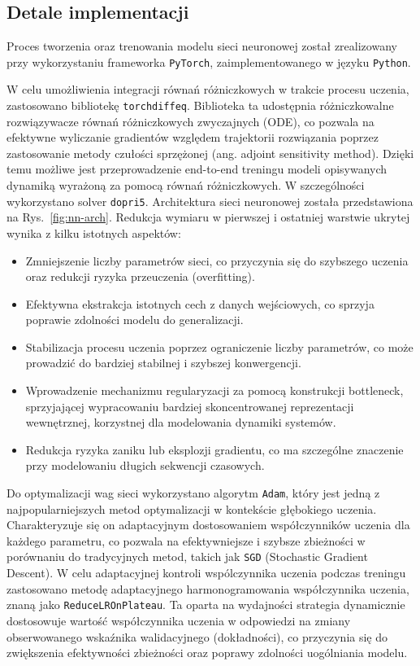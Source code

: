 \documentclass[11pt, oneside]{article}
\begin{document}
\subsection{Detale implementacji}
Proces tworzenia oraz trenowania modelu sieci neuronowej został zrealizowany przy wykorzystaniu frameworka \texttt{PyTorch}, zaimplementowanego w języku \texttt{Python}.

W celu umożliwienia integracji równań różniczkowych w trakcie procesu uczenia, zastosowano bibliotekę \texttt{torchdiffeq}. Biblioteka ta udostępnia różniczkowalne rozwiązywacze równań różniczkowych zwyczajnych (ODE), co pozwala na efektywne wyliczanie gradientów względem trajektorii rozwiązania poprzez zastosowanie metody czułości sprzężonej (ang. adjoint sensitivity method). Dzięki temu możliwe jest przeprowadzenie end-to-end treningu modeli opisywanych dynamiką wyrażoną za pomocą równań różniczkowych. W szczególności wykorzystano solver \texttt{dopri5}. Architektura sieci neuronowej została przedstawiona na Rys.~\ref{fig:nn-arch}. Redukcja wymiaru w pierwszej i ostatniej warstwie ukrytej wynika z kilku istotnych aspektów:

\begin{itemize}
    \item Zmniejszenie liczby parametrów sieci, co przyczynia się do szybszego uczenia oraz redukcji ryzyka przeuczenia (overfitting).
    \item Efektywna ekstrakcja istotnych cech z danych wejściowych, co sprzyja poprawie zdolności modelu do generalizacji.
    \item Stabilizacja procesu uczenia poprzez ograniczenie liczby parametrów, co może prowadzić do bardziej stabilnej i szybszej konwergencji.
    \item Wprowadzenie mechanizmu regularyzacji za pomocą konstrukcji bottleneck, sprzyjającej wypracowaniu bardziej skoncentrowanej reprezentacji wewnętrznej, korzystnej dla modelowania dynamiki systemów.
    \item Redukcja ryzyka zaniku lub eksplozji gradientu, co ma szczególne znaczenie przy modelowaniu długich sekwencji czasowych.
\end{itemize}


Do optymalizacji wag sieci wykorzystano algorytm \texttt{Adam}, który jest jedną z najpopularniejszych metod optymalizacji w kontekście głębokiego uczenia. Charakteryzuje się on adaptacyjnym dostosowaniem współczynników uczenia dla każdego parametru, co pozwala na efektywniejsze i szybsze zbieżności w porównaniu do tradycyjnych metod, takich jak \texttt{SGD} (Stochastic Gradient Descent).
W celu adaptacyjnej kontroli wspólczynnika uczenia podczas treningu zastosowano metodę adaptacyjnego harmonogramowania współczynnika uczenia, znaną jako \texttt{ReduceLROnPlateau}. Ta oparta na wydajności strategia dynamicznie dostosowuje wartość współczynnika uczenia w odpowiedzi na zmiany obserwowanego wskaźnika walidacyjnego (dokładności), co przyczynia się do zwiększenia efektywności zbieżności oraz poprawy zdolności uogólniania modelu.
\end{document}
